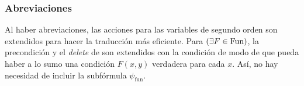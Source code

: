 %
%
%
%
%
%
%
%
%


\subsubsection{Abreviaciones}
Al haber abreviaciones, las acciones para las variables de segundo orden son
extendidos para hacer la traducción más eficiente. Para $(\exists F\in\text{Fun})$,
la precondición y el \textit{delete} de  son
extendidos con la condición  de modo de que pueda
haber a lo sumo una condición $F(x,y)$ verdadera para cada $x$. Así, no hay
necesidad de incluir la subfórmula $\psi_\text{fun}$. 


